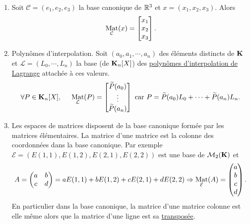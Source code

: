 \begin{exples}
 \begin{enumerate}
  \item Soit $\mathcal{C}=(e_1,e_2,e_3)$ la base canonique de $\mathbb{R}^3$ et $x=(x_1,x_2,x_3)$. Alors
\begin{displaymath}
\mathop{\mathrm{Mat}}_{\mathcal{C}}(x)=
\begin{bmatrix}
 x_1 \\ x_2 \\ x_3 
\end{bmatrix} .
\end{displaymath}

\item Polynômes d'interpolation. Soit $(a_0,a_1, \cdots, a_n)$ des éléments distincts de $\mathbf{K}$ et $\mathcal{L}=(L_0,\cdots , L_n)$ la base (de $\mathbf{K}_n[X]$) des \href{https://maquisdoc-math.fra1.digitaloceanspaces.com/C2233_1.pdf}{polynômes d'interpolation de Lagrange} attachée à ces valeurs.
\[
  \forall P \in \mathbf{K}_n[X], \hspace{0.5cm} 
\mathop{\mathrm{Mat}}_{\mathcal{L}}(P) =
\begin{bmatrix}
  \widetilde{P}(a_0)\\ \vdots \\ \widetilde{P}(a_n)
\end{bmatrix}
\text{ car } P = \widetilde{P}(a_0)L_0 + \cdots + \widetilde{P}(a_n)L_n.
\]

\item Les espaces de matrices disposent de la base canonique formée par les matrices élémentaires. La matrice d'une matrice est la colonne des coordonnées dans la base canonique.\newline
Par exemple $\mathcal{E} = \left( E(1,1), E(1,2), E(2,1), E(2,2) \right)$ est une base de $\mathcal{M}_2(\mathbf{K})$ et 
\begin{displaymath}
  A= \begin{pmatrix}
       a & b \\ c & d
     \end{pmatrix}
     = aE(1,1) + bE(1,2) + cE(2,1) + dE(2,2) 
\Rightarrow
\mathop{\mathrm{Mat}}_\mathcal{E}(A) =
\begin{pmatrix}
  a \\ b \\ c \\ d
\end{pmatrix}.
\end{displaymath}
En particulier dans la base canonique, la matrice d'une matrice colonne est elle même alors que la matrice d'une ligne est sa \href{https://maquisdoc-math.fra1.digitaloceanspaces.com/C2233_2.pdf}{transposée}.
 \end{enumerate}
\end{exples}

